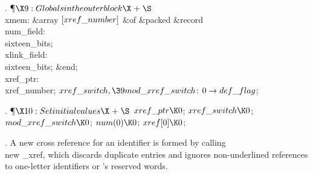 . \P$\X9:Globals in the outer block\X\mathrel{+}\S$\6
\4\\{xmem}: \&{array} $[\\{xref\_number}]$ \1\&{of}\5
\&{packed} \1\&{record} \hbox{}\6
\4\\{num\_field}: \\{sixteen\_bits};\6
\4\\{xlink\_field}: \\{sixteen\_bits};\2\6
\&{end};\2\6
\4\\{xref\_ptr}: \\{xref\_number};\6
\4$\\{xref\_switch},\39\\{mod\_xref\_switch}$: $0\to\\{def\_flag}$;\par
\fi

. \P$\X10:Set initial values\X\mathrel{+}\S$\6
$\\{xref\_ptr}\K0$;\5
$\\{xref\_switch}\K0$;\5
$\\{mod\_xref\_switch}\K0$;\5
$\\{num}(0)\K0$;\5
$\\{xref}[0]\K0$;\par
\fi

. A new cross reference for an identifier is formed by calling \\{new%
\_xref},
which discards duplicate entries and ignores non-underlined references
to one-letter identifiers or \PASCAL's reserved words.

